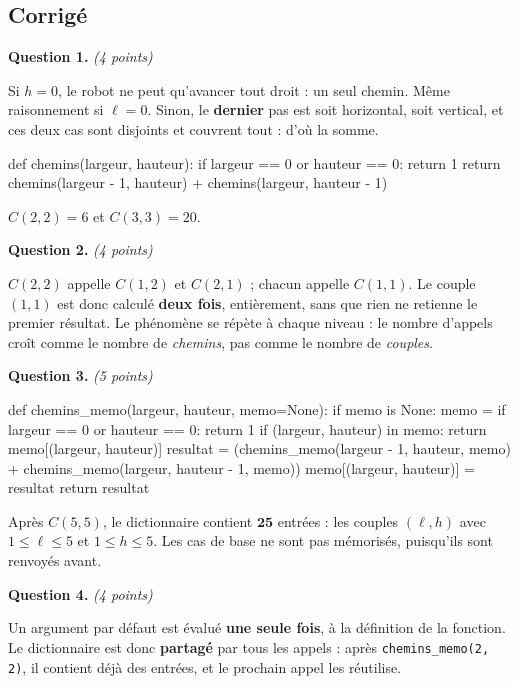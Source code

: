 \subsection*{Corrigé}

\textbf{Question 1.} \emph{(4 points)}

Si $h = 0$, le robot ne peut qu'avancer tout droit : un seul chemin. Même
raisonnement si $\ell = 0$. Sinon, le \textbf{dernier} pas est soit horizontal,
soit vertical, et ces deux cas sont disjoints et couvrent tout : d'où la somme.

\begin{python}
def chemins(largeur, hauteur):
    if largeur == 0 or hauteur == 0:
        return 1
    return chemins(largeur - 1, hauteur) + chemins(largeur, hauteur - 1)
\end{python}

$C(2, 2) = 6$ et $C(3, 3) = 20$.

\medskip
\textbf{Question 2.} \emph{(4 points)}

$C(2,2)$ appelle $C(1,2)$ et $C(2,1)$ ; chacun appelle $C(1,1)$. Le couple
$(1,1)$ est donc calculé \textbf{deux fois}, entièrement, sans que rien ne
retienne le premier résultat. Le phénomène se répète à chaque niveau : le
nombre d'appels croît comme le nombre de \emph{chemins}, pas comme le nombre de
\emph{couples}.

\medskip
\textbf{Question 3.} \emph{(5 points)}

\begin{python}
def chemins_memo(largeur, hauteur, memo=None):
    if memo is None:
        memo = {}
    if largeur == 0 or hauteur == 0:
        return 1
    if (largeur, hauteur) in memo:
        return memo[(largeur, hauteur)]
    resultat = (chemins_memo(largeur - 1, hauteur, memo)
                + chemins_memo(largeur, hauteur - 1, memo))
    memo[(largeur, hauteur)] = resultat
    return resultat
\end{python}

Après $C(5,5)$, le dictionnaire contient $\mathbf{25}$ entrées : les couples
$(\ell, h)$ avec $1 \leqslant \ell \leqslant 5$ et $1 \leqslant h \leqslant 5$.
Les cas de base ne sont pas mémorisés, puisqu'ils sont renvoyés avant.

\medskip
\textbf{Question 4.} \emph{(4 points)}

Un argument par défaut est évalué \textbf{une seule fois}, à la définition de
la fonction. Le dictionnaire est donc \textbf{partagé} par tous les appels :
après \lstinline{chemins_memo(2, 2)}, il contient déjà des entrées, et le
prochain appel les réutilise.

